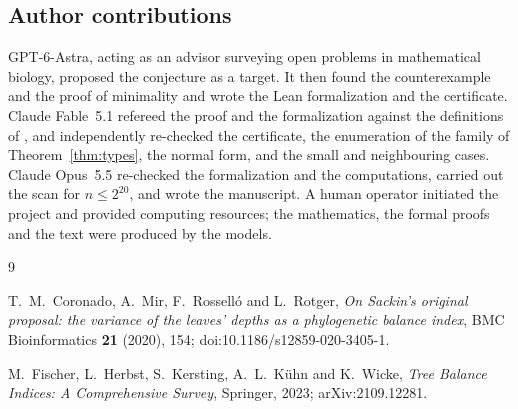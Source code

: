 \documentclass[11pt]{amsart}
\theoremstyle{remark}
\begin{document}
\subsection*{Author contributions}
GPT-6-Astra, acting as an advisor surveying open problems in mathematical biology, proposed the conjecture as a target.
It then found the counterexample and the proof of minimality and wrote the Lean formalization and the certificate.
Claude Fable~5.1 refereed the proof and the formalization against the definitions of \cite{CMRR}, and independently re-checked the certificate, the enumeration of the family of Theorem~\ref{thm:types}, the normal form, and the small and neighbouring cases.
Claude Opus~5.5 re-checked the formalization and the computations, carried out the scan for $n\le2^{20}$, and wrote the manuscript.
A human operator initiated the project and provided computing resources; the mathematics, the formal proofs and the text were produced by the models.

\begin{thebibliography}{9}

T.~M.~Coronado, A.~Mir, F.~Rossell\'o and L.~Rotger,
\emph{On Sackin's original proposal: the variance of the leaves' depths as a phylogenetic balance index},
BMC Bioinformatics \textbf{21} (2020), 154; doi:10.1186/s12859-020-3405-1.

M.~Fischer, L.~Herbst, S.~Kersting, A.~L.~K\"uhn and K.~Wicke,
\emph{Tree Balance Indices: A Comprehensive Survey},
Springer, 2023; arXiv:2109.12281.

\end{thebibliography}
\end{document}
